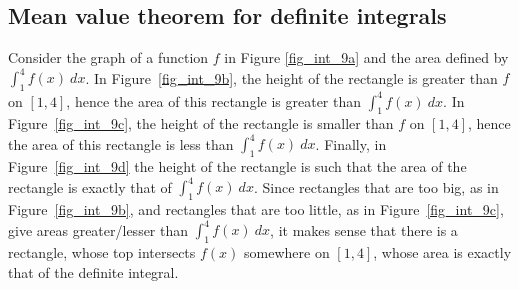 \subsection{Mean value theorem for definite integrals}
\ifcourse
	\checkoddpage
{}
 \fi
Consider the graph of a function $f$ in Figure \ref{fig_int_9a} and the area defined by $\int_1^4 f(x)\ dx$. In Figure~\ref{fig_int_9b}, the height of the rectangle is greater than $f$ on $[1,4]$, hence the area of this rectangle is greater than $\int_1^4 f(x)\ dx$. In Figure~\ref{fig_int_9c}, the height of the rectangle is smaller than $f$ on $[1,4]$, hence the area of this rectangle is less than $\int_1^4 f(x)\ dx$. Finally, in Figure~\ref{fig_int_9d} the height of the rectangle is such that the area of the rectangle is exactly that of $\int_1^4 f(x)\ dx$. Since rectangles that are too big, as in Figure~\ref{fig_int_9b}, and rectangles that are too little, as in Figure~\ref{fig_int_9c}, give areas greater/lesser than $\int_1^4 f(x)\ dx$, it makes sense that there is a rectangle, whose top intersects $f(x)$ somewhere on $[1,4]$, whose area is exactly that of the definite integral.



